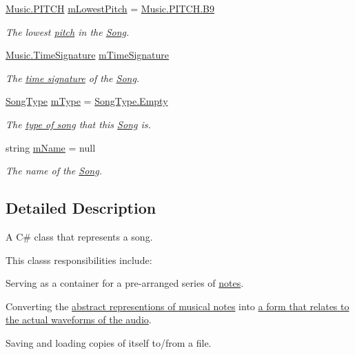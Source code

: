 \begin{DoxyCompactItemize}
\hyperlink{group___music_enums_ga508f69b199ea518f935486c990edac1d}{Music.\+P\+I\+T\+CH} \hyperlink{group___song_priv_var_ga293976ef4c2050687a81edfbf77b4fc1}{m\+Lowest\+Pitch} = \hyperlink{group___music_enums_gga508f69b199ea518f935486c990edac1da18fc90be5b8124af983421d29bfc4352}{Music.\+P\+I\+T\+C\+H.\+B9}
\begin{DoxyCompactList}\small\item\em The lowest \hyperlink{group___music_enums_ga508f69b199ea518f935486c990edac1d}{pitch} in the \hyperlink{class_song}{Song}. \end{DoxyCompactList}\item 
\hyperlink{group___music_structs_struct_music_1_1_time_signature}{Music.\+Time\+Signature} \hyperlink{group___song_priv_var_ga2b2dcc0e83e49f7303b6a1371877b25e}{m\+Time\+Signature}
\begin{DoxyCompactList}\small\item\em The \hyperlink{group___music_structs_struct_music_1_1_time_signature}{time signature} of the \hyperlink{class_song}{Song}. \end{DoxyCompactList}\item 
\hyperlink{group___song_enums_gae681a1f001333e39fc1cb4fea97bfe1b}{Song\+Type} \hyperlink{group___song_priv_var_gaf3b9d0f461522324f897b746311b43c5}{m\+Type} = \hyperlink{group___song_enums_ggae681a1f001333e39fc1cb4fea97bfe1bace2c8aed9c2fa0cfbed56cbda4d8bf07}{Song\+Type.\+Empty}
\begin{DoxyCompactList}\small\item\em The \hyperlink{group___song_enums_gae681a1f001333e39fc1cb4fea97bfe1b}{type of song} that this \hyperlink{class_song}{Song} is. \end{DoxyCompactList}\item 
string \hyperlink{group___song_priv_var_ga6a5e6c1e4aa92939e2b5c1e3d9908df8}{m\+Name} = null
\begin{DoxyCompactList}\small\item\em The name of the \hyperlink{class_song}{Song}. \end{DoxyCompactList}\end{DoxyCompactItemize}


\subsection{Detailed Description}
A C\# class that represents a song. 

This class\textquotesingle{}s responsibilities include\+: \begin{DoxyItemize}
\item Serving as a container for a pre-\/arranged series of \hyperlink{group___music_structs_struct_music_1_1_combined_note}{notes}. \item Converting the \hyperlink{group___music_structs_struct_music_1_1_combined_note}{abstract representions of musical notes} into \hyperlink{group___song_structs_struct_song_1_1_combined_note_data}{a form that relates to the actual waveforms of the audio}. \item Saving and loading copies of itself to/from a file. \end{DoxyItemize}


